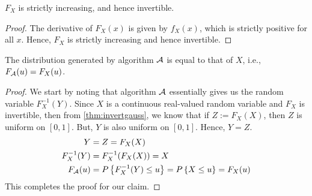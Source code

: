 \begin{claim}
	$F_X$ is strictly increasing, and hence invertible.
\end{claim}
\begin{proof}
	The derivative of $F_X(x)$ is given by $f_X(x)$, which is strictly positive for all $x$. Hence, $F_X$ is strictly increasing and hence invertible.
\end{proof}

\begin{claim}
	The distribution generated by algorithm $\cal{A}$ is equal to that of $X$, i.e., $F_{\cal{A}} (u) = F_X(u)$.
\end{claim}
\begin{proof}
	We start by noting that algorithm $\cal{A}$ essentially gives us the random variable $F_X^{-1}(Y)$.
	Since $X$ is a continuous real-valued random variable and $F_X$ is invertible, then from \cref{thm:invertgauss}, we know that if $Z := F_X(X)$, then $Z$ is uniform on $[0,1]$.
	But, $Y$ is also uniform on $[0,1]$. Hence, $Y=Z$.
	\begin{align*}
		Y              & = Z = F_X(X)                                                             \\
		F_X^{-1}(Y)    & = F_X^{-1}(F_X(X)) = X                                                   \\
		F_{\cal{A}}(u) & = P\left\{F_X^{-1}(Y) \leq u\right\} = P\left\{X \leq u\right\} = F_X(u)
	\end{align*}
	This completes the proof for our claim.
\end{proof}

